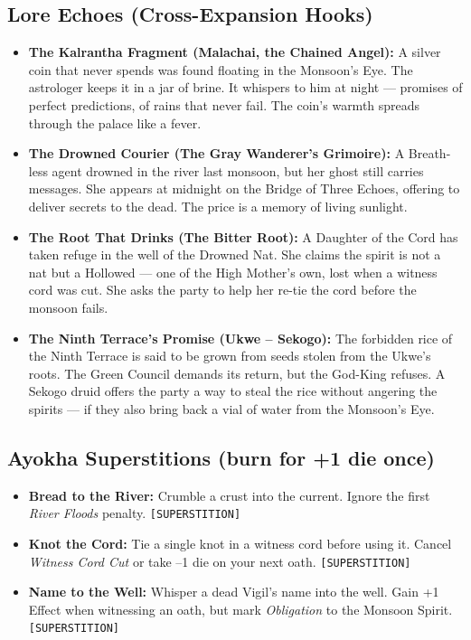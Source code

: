 \subsection*{Lore Echoes (Cross-Expansion Hooks)}
\begin{itemize}
  \item \textbf{The Kalrantha Fragment (Malachai, the Chained Angel):} A silver coin that never spends was found floating in the Monsoon's Eye. The astrologer keeps it in a jar of brine. It whispers to him at night --- promises of perfect predictions, of rains that never fail. The coin's warmth spreads through the palace like a fever.
  \item \textbf{The Drowned Courier (The Gray Wanderer's Grimoire):} A Breath-less agent drowned in the river last monsoon, but her ghost still carries messages. She appears at midnight on the Bridge of Three Echoes, offering to deliver secrets to the dead. The price is a memory of living sunlight.
  \item \textbf{The Root That Drinks (The Bitter Root):} A Daughter of the Cord has taken refuge in the well of the Drowned Nat. She claims the spirit is not a nat but a Hollowed --- one of the High Mother's own, lost when a witness cord was cut. She asks the party to help her re-tie the cord before the monsoon fails.
  \item \textbf{The Ninth Terrace's Promise (Ukwe -- Sekogo):} The forbidden rice of the Ninth Terrace is said to be grown from seeds stolen from the Ukwe's roots. The Green Council demands its return, but the God-King refuses. A Sekogo druid offers the party a way to steal the rice without angering the spirits --- if they also bring back a vial of water from the Monsoon's Eye.
\end{itemize}

\subsection*{Ayokha Superstitions (burn for +1 die once)}
\begin{itemize}
  \item \textbf{Bread to the River:} Crumble a crust into the current. Ignore the first \emph{River Floods} penalty. \texttt{[SUPERSTITION]}
  \item \textbf{Knot the Cord:} Tie a single knot in a witness cord before using it. Cancel \emph{Witness Cord Cut} or take --1 die on your next oath. \texttt{[SUPERSTITION]}
  \item \textbf{Name to the Well:} Whisper a dead Vigil's name into the well. Gain +1 Effect when witnessing an oath, but mark \emph{Obligation} to the Monsoon Spirit. \texttt{[SUPERSTITION]}
\end{itemize}

